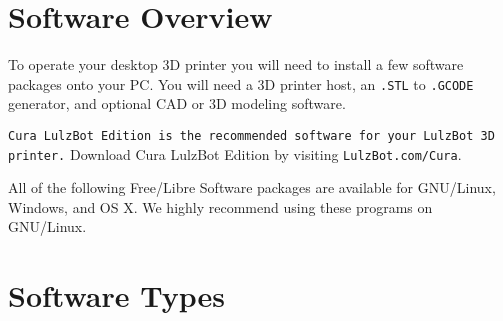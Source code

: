 %
%
%
%
%

\section{Software Overview}

To operate your desktop 3D printer you will need to install a few software packages onto your PC. You will need a 3D printer host, an \texttt{.STL} to \texttt{.GCODE} generator, and optional CAD or 3D modeling software.

\texttt{Cura LulzBot\textsuperscript{\miniscule{\textregistered}} Edition is the recommended software for your LulzBot 3D printer.} Download Cura LulzBot Edition by visiting \texttt{LulzBot.com/Cura}.



All of the following Free/Libre Software packages are available for GNU/Linux, Windows, and OS X. We highly recommend using these programs on GNU/Linux.

\section{Software Types}

